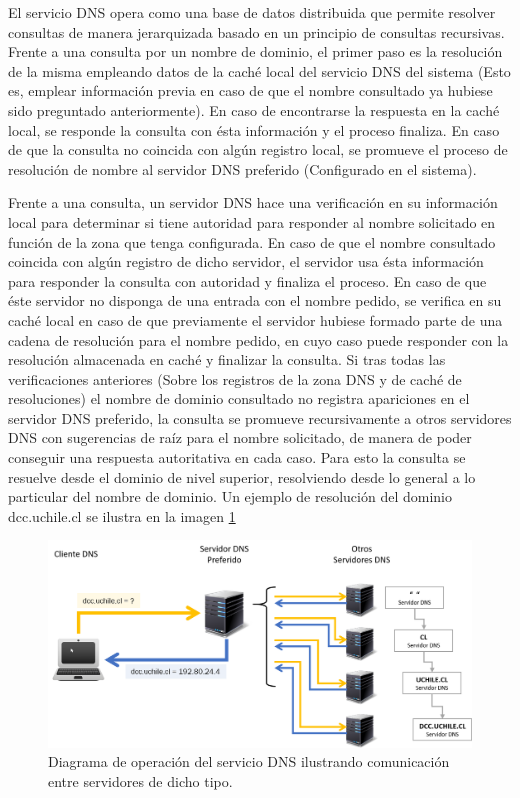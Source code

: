 El servicio DNS \cite{rfc:1034, rfc:1035} opera como una base de datos distribuida que permite resolver consultas de manera jerarquizada basado en un principio de consultas recursivas. Frente a una consulta por un nombre de dominio, el primer paso es la resolución de la misma empleando datos de la caché local del servicio DNS del sistema (Esto es, emplear información previa en caso de que el nombre consultado ya hubiese sido preguntado anteriormente). En caso de encontrarse la respuesta en la caché local, se responde la consulta con ésta información y el proceso finaliza. En caso de que la consulta no coincida con algún registro local, se promueve el proceso de resolución de nombre al servidor DNS preferido (Configurado en el sistema).  

Frente a una consulta, un servidor DNS hace una verificación en su información local para determinar si tiene autoridad para responder al nombre solicitado en función de la zona que tenga configurada. En caso de que el nombre consultado coincida con algún registro de dicho servidor, el servidor usa ésta información para responder la consulta con autoridad y finaliza el proceso. En caso de que éste servidor no disponga de una entrada con el nombre pedido, se verifica en su caché local en caso de que previamente el servidor hubiese formado parte de una cadena de resolución para el nombre pedido, en cuyo caso puede responder con la resolución almacenada en caché y finalizar la consulta. Si tras todas las verificaciones anteriores (Sobre los registros de la zona DNS y de caché de resoluciones) el nombre de dominio consultado no registra apariciones en el servidor DNS preferido, la consulta se promueve recursivamente a otros servidores DNS con sugerencias de raíz para el nombre solicitado, de manera de poder conseguir una respuesta autoritativa en cada caso. Para esto la consulta se resuelve desde el dominio de nivel superior, resolviendo desde lo general a lo particular del nombre de dominio. Un ejemplo de resolución del dominio dcc.uchile.cl se ilustra en la imagen \ref{fig:dns}

\begin{figure}[!h]
	\centering
	\includegraphics[scale=0.75]{imagenes/dns-system.png}
	\caption{Diagrama de operación del servicio DNS ilustrando comunicación entre servidores de dicho tipo.}
	\label{fig:dns}
\end{figure}

